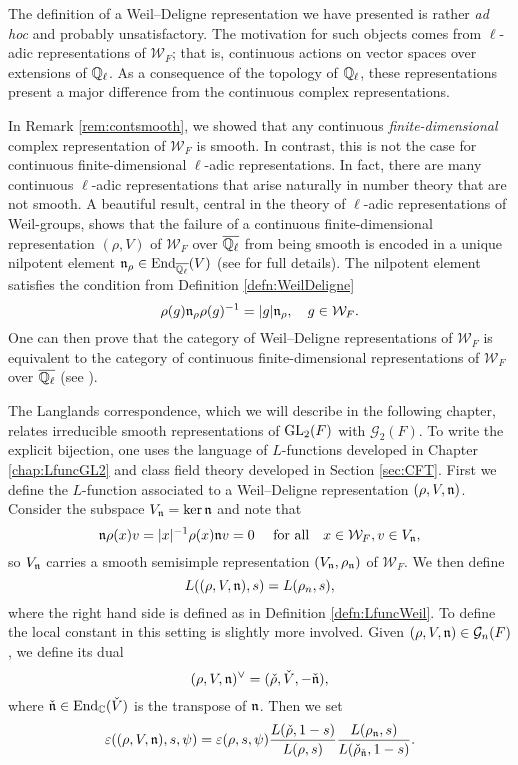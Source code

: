 \begin{rem}
    The definition of a Weil--Deligne representation we have presented is rather \textit{ad hoc} and probably unsatisfactory. The motivation for such objects comes from $\ell$-adic representations of $\mathcal{W}_F$; that is, continuous actions on vector spaces over extensions of $\mathbb{Q}_\ell$. As a consequence of the topology of $\mathbb{Q}_\ell$, these representations present a major difference from the continuous complex representations. 

    In Remark \ref{rem:contsmooth}, we showed that any continuous \textit{finite-dimensional} complex representation of $\mathcal{W}_F$ is smooth. In contrast, this is not the case for continuous finite-dimensional $\ell$-adic representations. In fact, there are many continuous $\ell$-adic representations that arise naturally in number theory that are not smooth. A beautiful result, central in the theory of $\ell$-adic representations of Weil-groups, shows that the failure of a continuous finite-dimensional representation $(\rho,V)$ of $\mathcal{W}_F$ over $\overline{\mathbb{Q}_\ell}$ from being smooth is encoded in a unique nilpotent element $\mathfrak{n}_\rho\in\mathrm{End}_{\overline{\mathbb{Q}_\ell}}(V)$ (see \cite[32.5 Theorem]{BH1} for full details). The nilpotent element satisfies the condition from Definition \ref{defn:WeilDeligne}
    $$\rho(g)\mathfrak{n}_\rho\rho(g)^{-1}=|g|\mathfrak{n}_\rho,\quad g\in \mathcal{W}_F.$$
    One can then prove that the category of Weil--Deligne representations of $\mathcal{W}_F$ is equivalent to the category of continuous finite-dimensional representations of $\mathcal{W}_F$ over $\overline{\mathbb{Q}_\ell}$ (see \cite[32.6 Theorem]{BH1}). 
\end{rem}

The Langlands correspondence, which we will describe in the following chapter, relates irreducible smooth representations of $\mathrm{GL}_2(F)$ with $\mathcal{G}_2(F)$. To write the explicit bijection, one uses the language of $L$-functions developed in Chapter \ref{chap:LfuncGL2} and class field theory developed in Section \ref{sec:CFT}.
First we define the $L$-function associated to a Weil--Deligne representation $(\rho,V,\mathfrak{n})$. Consider the subspace $V_{\mathfrak{n}}=\ker\mathfrak{n}$ and note that 
$$\mathfrak{n}\rho(x)v=|x|^{-1}\rho(x)\mathfrak{n} v=0\quad\text{ for all}\quad x\in \mathcal{W}_F,v\in V_{\mathfrak{n}},$$
so $V_{\mathfrak{n}}$ carries a smooth semisimple representation $(V_{\mathfrak{n}},\rho_{\mathfrak{n}})$ of $\mathcal{W}_F$. We then define 
$$L((\rho,V,\mathfrak{n}),s)=L(\rho_n,s),$$
where the right hand side is defined as in Definition \ref{defn:LfuncWeil}. To define the local constant in this setting is slightly more involved. Given $(\rho,V,\mathfrak{n})\in\mathcal{G}_n(F)$, we define its dual
$$(\rho,V,\mathfrak{n})^\vee=(\check\rho,\check{V},-\check{\mathfrak{n}}),$$
where $\check{\mathfrak{n}}\in\mathrm{End}_{\mathbb{C}}(\check{V})$ is the transpose of $\mathfrak{n}$. Then we set
$$\varepsilon((\rho,V,\mathfrak{n}),s,\psi)=\varepsilon(\rho,s,\psi)\frac{L(\check{\rho},1-s)}{L(\rho,s)}\frac{L(\rho_{\mathfrak{n}},s)}{L(\check{\rho}_{\check{\mathfrak{n}}},1-s)}.$$

\newpage

